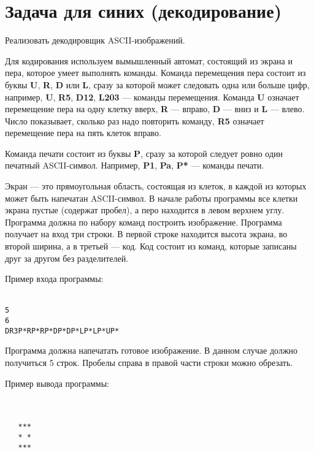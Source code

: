 \documentclass[a4paper,10pt]{article}
\begin{document}
\section*{Задача для синих (декодирование)}

Реализовать декодировщик ASCII-изображений.

Для кодирования используем вымышленный автомат, состоящий из экрана и пера, которое умеет выполнять команды. Команда перемещения пера состоит из буквы \textbf{U}, \textbf{R}, \textbf{D} или \textbf{L}, сразу за которой может следовать одна или больше цифр, например, \textbf{U}, \textbf{R5}, \textbf{D12}, \textbf{L203} — команды перемещения. Команда \textbf{U} означает перемещение пера на одну клетку вверх, \textbf{R} — вправо, \textbf{D} — вниз и \textbf{L} — влево. Число показывает, сколько раз надо повторить команду, \textbf{R5} означает перемещение пера на пять клеток вправо.

Команда печати состоит из буквы \textbf{P}, сразу за которой следует ровно один печатный ASCII-символ. Например, \textbf{P1}, \textbf{Pa}, \textbf{P*} — команды печати.

Экран — это прямоугольная область, состоящая из клеток, в каждой из которых может быть напечатан ASCII-символ. В начале работы программы все клетки экрана пустые (содержат пробел), а перо находится в левом верхнем углу. Программа должна по набору команд построить изображение. Программа получает на вход три строки. В первой строке находится высота экрана, во второй ширина, а в третьей — код. Код состоит из команд, которые записаны друг за другом без разделителей.

Пример входа программы:

\texttt{ \\
5\\
6\\
DR3P*RP*RP*DP*DP*LP*LP*UP*}

Программа должна напечатать готовое изображение. В данном случае должно получиться 5 строк. Пробелы справа в правой части строки можно обрезать.

Пример вывода программы:


\texttt{ \\
\\
\ \ \ ***\\
\ \ \ *\ *\\
\ \ \ ***\\
\\
}
\end{document}
